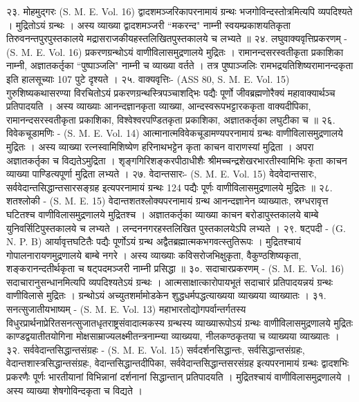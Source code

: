 २३. मोहमुद्गरः (S. M. E. Vol. 16)
द्वादशमञ्जरिकापरनामायं ग्रन्थः भजगोविन्दस्तोत्रमित्यपि व्यपदिश्यते । मुद्रितोऽयं ग्रन्थः । अस्य व्याख्या द्वादशमञ्जरी ``मकरन्द" नाम्नी स्वयम्प्रकाशयतिकृता तिरुवनन्तपुरपुस्तकालये मद्रासराजकीयहस्तलिखितपुस्तकालये च लभ्यते ॥
२४. लघुवाक्यवृत्तिप्रकरणम् - (S. M. E. Vol. 16)
प्रकरणग्रन्थोऽयं वाणीविलासमुद्रणालये मुद्रितः । रामानन्दसरस्वतीकृता प्रकाशिका नाम्नी, अज्ञातकर्तृका ``पुष्पाञ्जलि" नाम्नी च व्याख्या वर्तते । तत्र पुष्पाञ्जलिः रामभद्रयतिशिष्यरामानन्दकृता इति हालसूच्याः 107 पुटे दृश्यते ।
२५. वाक्यवृत्तिः- (ASS 80, S. M. E. Vol. 15)
गुरुशिष्यकथासरण्या विरचितोऽयं प्रकरणग्रन्थस्त्रिपञ्चाशद्भिः पद्यैः पूर्णो जीवब्रह्मणोरैक्यं महावाक्यार्थञ्च प्रतिपादयति । अस्य व्याख्याः आनन्दज्ञानकृता व्याख्या, आन्दस्वरूपभट्टारककृता वाक्यदीपिका, रामानन्दसरस्वतीकृता प्रकाशिका, विश्वेश्वरपण्डितकृता प्रकाशिका, अज्ञातकर्तृका लघुटीका च ॥
२६. विवेकचूडामणिः - (S. M. E. Vol. 14)
आत्मानात्मविवेकचूडामण्यपरनामायं ग्रन्थः वाणीविलासमुद्रणालये मुद्रितः । अस्य व्याख्या रत्नस्वामिशिष्येण हरिनाथभट्टेन कृता काचन वाराणस्यां मुद्रिता । अपरा अज्ञातकर्तृका च विद्यतेऽमुद्रिता । शृङ्गगिरिशङ्करपीठाधीशैः श्रीमच्चन्द्रशेखरभारतीस्वामिभिः कृता काचन व्याख्या पाण्डित्यपूर्णा मुद्रिता लभ्यते ।
२७. वेदान्तसारः- (S. M. E. Vol. 15)
वेदवेदान्तसारः, सर्ववेदान्तसिद्धान्तसारसङ्ग्रह इत्यपरनामायं ग्रन्थः 124 पद्यैः पूर्णः वाणीविलासमुद्रणालये मुद्रितः ॥
२८. शतश्लोकी - (S. M. E. 15)
वेदान्तशतश्लोक्यपरनामायं ग्रन्थ आनन्दज्ञानेन व्याख्यातः, स्रग्धरावृत्त घटितश्च वाणीविलासमुद्रणालये मुद्रितश्च । अज्ञातकर्तृका व्याख्या काचन बरोडापुस्तकालये बाम्बे युनिवर्सिटिपुस्तकालये च लभ्यते । लन्दननगरहस्तलिखित पुस्तकालयेऽपि लभ्यते ।
२९. षट्पदी - (G. N. P. B)
आर्यावृत्तघटितैः पद्यैः पूर्णोऽयं ग्रन्थ अद्वैतब्रह्मात्मकभगवत्स्तुतिरूपः । मुद्रितश्चायं गोपालनारायणमुद्रणालये बाम्बे नगरे । अस्य व्याख्याः कविसरोजभिक्षुकृता, वैकुण्ठशिष्यकृता, शङ्करानन्दतीर्थकृता च षट्पदमञ्जरी नाम्नी प्रसिद्धा ॥
३०. सदाचारप्रकरणम् - (S. M. E. Vol. 16)
सदाचारानुसन्धानमित्यपि व्यपदिश्यतेऽयं ग्रन्थः । आत्मसाक्षात्कारोपायभूतं सदाचारं प्रतिपादयन्नयं ग्रन्थः वाणीविलासे मुद्रितः । ग्रन्थोऽयं अच्युतशर्मामोडकेन शुद्धधर्मपद्धत्याख्यया व्याख्यया व्याख्यातः ।
३१. सनत्सुजातीयभाष्यम् - (S. M. E. Vol. 13)
महाभारतोद्योगपर्वान्तर्गतस्य विधुरप्रार्थनाप्रेरितसनत्सुजातधृतराष्ट्रसंवादात्मकस्य ग्रन्थस्य व्याख्यारूपोऽयं ग्रन्थः वाणीविलासमुद्रणालये मुद्रितः काण्डद्वयातीतयोगिना मोक्षसाम्राज्यलक्ष्मीतन्त्रनाम्न्या व्याख्यया, नीलकण्ठकृतया च व्याख्यया व्याख्यातः ।
३२. सर्ववेदान्तसिद्धान्तसंग्रहः - (S. M. E. Vol. 15)
सर्वदर्शनसिद्धान्तः, सर्वसिद्धान्तसंग्रहः, वेदान्तशास्त्रसिद्धान्तसंग्रहः, वेदान्तसिद्धान्तदीपिका, सर्ववेदान्तसिद्धान्तसरसंग्रह इत्यपरनामायं ग्रन्थः द्वादशभिः प्रकरणैः पूर्णः भारतीयानां विभिन्नानां दर्शनानां सिद्धान्तान् प्रतिपादयति । मुद्रितश्चायं वाणीविलासमुद्रणालये । अस्य व्याख्या शेषगोविन्दकृता च विद्यते ।
